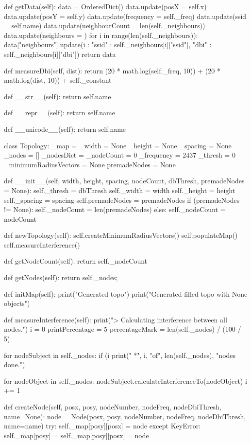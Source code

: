 \begin{appendices}
\begin{python}
	def getData(self):
		data = OrderedDict()
		data.update(posX = self.x)
		data.update(posY = self.y)
		data.update(frequency = self._freq)
		data.update(ssid = self.name)
		data.update(neighbourCount = len(self._neighbours))
		data.update(neighbours = {})
		for i in range(len(self._neighbours)):
			data["neighbours"].update({i : {"ssid" : self._neighbours[i]["ssid"],
																			"dbi" : self._neighbours[i]["dbi"]}})
		return data

	def measureDbi(self, dist):
		return (20 * math.log(self._freq, 10)) + (20 * math.log(dist, 10)) + self._constant

	def __str__(self):
		return self.name

	def __repr__(self):
		return self.name

	def __unicode__(self):
		return self.name

class Topology: 
 _map = {}
 _width = None
 _height = None
 _spacing = None
 _nodes = []
 _nodesDict = {}
 _nodeCount = 0
 _frequency = 2437
 _thresh = 0
 _minimumRadiusVectors = None
 premadeNodes = None

 def __init__(self, width, height, spacing, nodeCount, dbThresh, premadeNodes = None):
	self._thresh = dbThresh
	self._width = width
	self._height = height
	self._spacing = spacing
	self.premadeNodes = premadeNodes
	if (premadeNodes != None):
		self._nodeCount = len(premadeNodes)
	else:
		self._nodeCount = nodeCount

 def newTopology(self):
	self.createMinimumRadiusVectors()
	self.populateMap()
	self.measureInterference()

 def getNodeCount(self):
	return self._nodeCount

 def getNodes(self):
	return self._nodes;

 def initMap(self):
	print("Generated topo")
	print("Generated filled topo with None objects")

 def measureInterference(self):
	print("> Calculating interference between all nodes.")
	i = 0
	printPercentage = 5
	percentageMark = len(self._nodes) / (100 / 5)

	for nodeSubject in self._nodes:  
		if (i %
		print(" *", i, "of", len(self._nodes), "nodes done.")

		for nodeObject in self._nodes:
		nodeSubject.calculateInterferenceTo(nodeObject) 
		i += 1

 def createNode(self, posx, posy, nodeNumber, nodeFreq, nodeDbiThresh, name=None):
	node = Node(posx, posy, nodeNumber, nodeFreq, nodeDbiThresh, name=name)
	try: 
		self._map[posy][posx] = node
	except KeyError:
		self._map[posy] = {}
		self._map[posy][posx] = node


\end{python}
\end{appendices}
